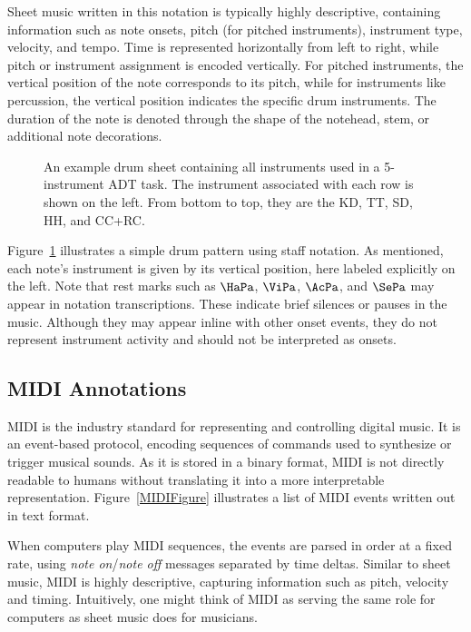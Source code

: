 Sheet music written in this notation is typically highly descriptive, containing information such as note onsets, pitch (for pitched instruments), instrument type, velocity, and tempo. Time is represented horizontally from left to right, while pitch or instrument assignment is encoded vertically. For pitched instruments, the vertical position of the note corresponds to its pitch, while for instruments like percussion, the vertical position indicates the specific drum instruments. The duration of the note is denoted through the shape of the notehead, stem, or additional note decorations.

\begin{figure}[H]
    \centering
    
    \caption{An example drum sheet containing all instruments used in a 5-instrument \gls{ADT} task. The instrument associated with each row is shown on the left. From bottom to top, they are the \acrfull{KD}, \acrfull{TT}, \acrfull{SD}, \acrfull{HH}, and \acrfull{CC+RC}.}
    \label{DrumsheetFigure}
\end{figure}

Figure~\ref{DrumsheetFigure} illustrates a simple drum pattern using staff notation. As mentioned, each note's instrument is given by its vertical position, here labeled explicitly on the left. Note that rest marks such as $\HaPa$, $\ViPa$, $\AcPa$, and $\SePa$ may appear in notation transcriptions. These indicate brief silences or pauses in the music. Although they may appear inline with other onset events, they do not represent instrument activity and should not be interpreted as onsets.

\subsection{MIDI Annotations}

\gls{MIDI} is the industry standard for representing and controlling digital music. It is an event-based protocol, encoding sequences of commands used to synthesize or trigger musical sounds. As it is stored in a binary format, \gls{MIDI} is not directly readable to humans without translating it into a more interpretable representation. Figure~\ref{MIDIFigure} illustrates a list of MIDI events written out in text format.

When computers play \gls{MIDI} sequences, the events are parsed in order at a fixed rate, using \textit{note on}/\textit{note off} messages separated by time deltas. Similar to sheet music, \gls{MIDI} is highly descriptive, capturing information such as pitch, velocity and timing. Intuitively, one might think of \gls{MIDI} as serving the same role for computers as sheet music does for musicians.

